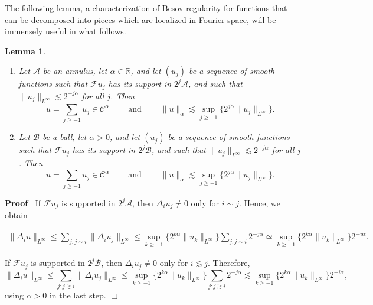 \documentclass[a4paper,11pt]{article}
\newcommand{\tmdummy}{$\mbox{}$}
\newcommand{\tmop}[1]{\ensuremath{\operatorname{#1}}}
\newenvironment{enumeratenumeric}{\begin{enumerate}[1.] }{\end{enumerate}}
\newenvironment{proof}{\noindent\textbf{Proof\ }}{\hspace*{\fill}$\Box$\medskip}
\newtheorem{lemma}{Lemma}
{\theorembodyfont{\rmfamily}\newtheorem{remark}{Remark}}
\newcommand{\CA}{\mathscr{A}}
\newcommand{\CB}{\mathscr{B}}
\newcommand{\CF}{\mathscr{F}}
\newcommand{\CC}{\mathscr{C}}
\begin{document}
The following lemma, a characterization of Besov regularity for functions that
can be decomposed into pieces which are localized in Fourier space, will be
immensely useful in what follows.

\begin{lemma}
  \label{lem: Besov regularity of series}{\tmdummy}
  
  \begin{enumeratenumeric}
    \item Let $\CA$ be an annulus, let $\alpha \in \mathbb{\mathbb{R}}$, and
    let $(u_j)$ be a sequence of smooth functions such that $\CF u_j$ has its
    support in $2^j \CA$, and such that $\|u_j \|_{L^{\infty}} \lesssim 2^{- j
    \alpha}$ for all $j$. Then
    \[ u = \sum_{j \geqslant - 1} u_j \in \CC^{\alpha} \hspace{2em} \tmop{and}
       \hspace{2em} \|u\|_{\alpha} \lesssim \sup_{j \geqslant - 1} \{2^{j
       \alpha} \|u_j \|_{L^{\infty}} \} . \]
    \item Let $\CB$ be a ball, let $\alpha > 0$, and let $(u_j)$ be a sequence
    of smooth functions such that $\CF u_j$ has its support in $2^j \CB$, and
    such that $\|u_j \|_{L^{\infty}} \lesssim 2^{- j \alpha}$ for all $j$.
    Then
    \[ u = \sum_{j \geqslant - 1} u_j \in \CC^{\alpha} \hspace{2em} \tmop{and}
       \hspace{2em} \|u\|_{\alpha} \lesssim \sup_{j \geqslant - 1} \{2^{j
       \alpha} \|u_j \|_{L^{\infty}} \} . \]
  \end{enumeratenumeric}
\end{lemma}

\begin{proof}
  If $\CF u_j$ is supported in $2^j \CA$, then $\Delta_i u_j \neq 0$ only for
  $i \sim j$. Hence, we obtain
  
  \begin{gather*}
    \| \Delta_i u\|_{L^{\infty}} \leqslant \sum_{j : j \sim i} \| \Delta_i u_j
    \|_{L^{\infty}} \leqslant \sup_{k \geqslant - 1} \{2^{k \alpha} \|u_k
    \|_{L^{\infty}} \}  \sum_{j : j \sim i} 2^{- j \alpha} \simeq \sup_{k
    \geqslant - 1} \{2^{k \alpha} \|u_k \|_{L^{\infty}} \} 2^{- i \alpha} .
  \end{gather*}
  
  If $\CF u_j$ is supported in $2^j \CB$, then $\Delta_i u_j \neq 0$ only for
  $i \lesssim j$. Therefore,
  \[ \| \Delta_i u\|_{L^{\infty}} \leqslant \sum_{j : j \gtrsim i} \| \Delta_i
     u_j \|_{L^{\infty}} \leqslant \sup_{k \geqslant - 1} \{2^{k \alpha} \|u_k
     \|_{L^{\infty}} \}  \sum_{j : j \gtrsim i} 2^{- j \alpha} \lesssim
     \sup_{k \geqslant - 1} \{2^{k \alpha} \|u_k \|_{L^{\infty}} \} 2^{- i
     \alpha}, \]
  using $\alpha > 0$ in the last step.
\end{proof}
\end{document}
